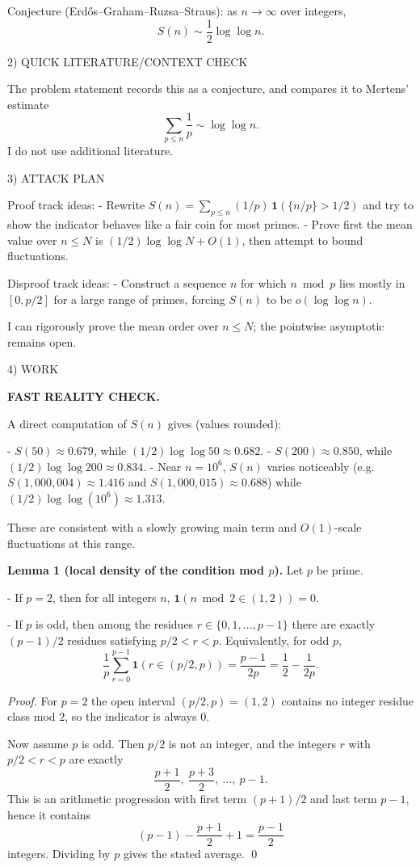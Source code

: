 Conjecture (Erd\H{o}s--Graham--Ruzsa--Straus): as $n\to\infty$ over integers,
\[
S(n) \sim \frac{1}{2}\log\log n.
\]

2) QUICK LITERATURE/CONTEXT CHECK

The problem statement records this as a conjecture, and compares it to Mertens' estimate
\[
\sum_{p\le n}\frac{1}{p}\sim \log\log n.
\]
I do not use additional literature.

3) ATTACK PLAN

Proof track ideas:
- Rewrite $S(n)=\sum_{p\le n}(1/p)\,\mathbf 1(\{n/p\}>1/2)$ and try to show the indicator behaves like a fair coin for most primes.
- Prove first the mean value over $n\le N$ is $(1/2)\log\log N+O(1)$, then attempt to bound fluctuations.

Disproof track ideas:
- Construct a sequence $n$ for which $n\bmod p$ lies mostly in $[0,p/2]$ for a large range of primes, forcing $S(n)$ to be $o(\log\log n)$.

I can rigorously prove the mean order over $n\le N$; the pointwise asymptotic remains open.

4) WORK

\textbf{FAST REALITY CHECK.}

A direct computation of $S(n)$ gives (values rounded):

- $S(50)\approx 0.679$, while $(1/2)\log\log 50\approx 0.682$.
- $S(200)\approx 0.850$, while $(1/2)\log\log 200\approx 0.834$.
- Near $n=10^6$, $S(n)$ varies noticeably (e.g. $S(1{,}000{,}004)\approx 1.416$ and $S(1{,}000{,}015)\approx 0.688$) while $(1/2)\log\log(10^6)\approx 1.313$.

These are consistent with a slowly growing main term and $O(1)$-scale fluctuations at this range.

\medskip

\textbf{Lemma 1 (local density of the condition mod $p$).}
Let $p$ be prime.

- If $p=2$, then for all integers $n$, $\mathbf 1(n\bmod 2\in(1,2))=0$.

- If $p$ is odd, then among the residues $r\in\{0,1,\dots,p-1\}$ there are exactly $(p-1)/2$ residues satisfying $p/2<r<p$.
Equivalently, for odd $p$,
\[
\frac{1}{p}\sum_{r=0}^{p-1} \mathbf 1(r\in(p/2,p)) = \frac{p-1}{2p} = \frac12-\frac{1}{2p}.
\]

\emph{Proof.}
For $p=2$ the open interval $(p/2,p)=(1,2)$ contains no integer residue class mod $2$, so the indicator is always $0$.

Now assume $p$ is odd. Then $p/2$ is not an integer, and the integers $r$ with $p/2<r<p$ are exactly
\[
\frac{p+1}{2},\ \frac{p+3}{2},\ \dots,\ p-1.
\]
This is an arithmetic progression with first term $(p+1)/2$ and last term $p-1$, hence it contains
\[
(p-1) - \frac{p+1}{2} + 1 = \frac{p-1}{2}
\]
integers.
Dividing by $p$ gives the stated average.
\qed

